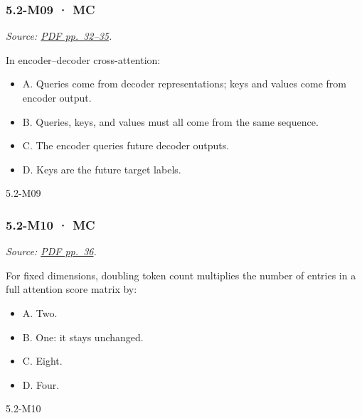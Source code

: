\noindent\begin{minipage}{\linewidth}

\subsubsection{5.2-M09 · MC}\label{m09-mc-13}

\emph{Source:
\href{../Lecture\%20Slides/5.2.\%20Transformers.pdf\#page=32}{PDF
pp.~32--35}.}

In encoder--decoder cross-attention:

\begin{itemize}
\tightlist
\item
  A. Queries come from decoder representations; keys and values come
  from encoder output.
\item
  B. Queries, keys, and values must all come from the same sequence.
\item
  C. The encoder queries future decoder outputs.
\item
  D. Keys are the future target labels.
\end{itemize}

\begin{solution}[8mm]{5.2-M09}

\end{solution}
\end{minipage}\par\medskip

\noindent\begin{minipage}{\linewidth}

\subsubsection{5.2-M10 · MC}\label{m10-mc-13}

\emph{Source:
\href{../Lecture\%20Slides/5.2.\%20Transformers.pdf\#page=36}{PDF
pp.~36}.}

For fixed dimensions, doubling token count multiplies the number of
entries in a full attention score matrix by:

\begin{itemize}
\tightlist
\item
  A. Two.
\item
  B. One: it stays unchanged.
\item
  C. Eight.
\item
  D. Four.
\end{itemize}

\begin{solution}[8mm]{5.2-M10}

\end{solution}
\end{minipage}\par\medskip

